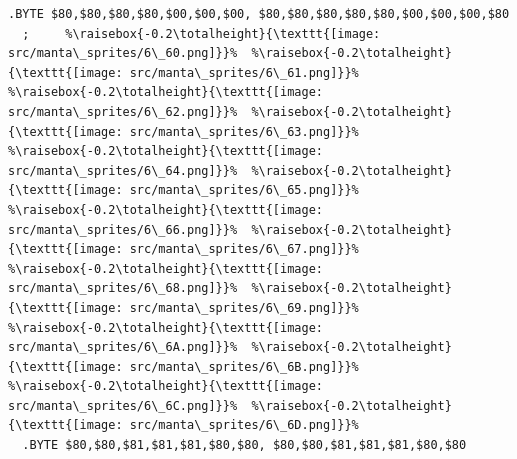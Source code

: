 \begin{lstlisting}[escapechar=\%]
  .BYTE $80,$80,$80,$80,$00,$00,$00, $80,$80,$80,$80,$80,$00,$00,$00,$80
  ;     %\raisebox{-0.2\totalheight}{\texttt{[image: src/manta\_sprites/6\_60.png]}}%  %\raisebox{-0.2\totalheight}{\texttt{[image: src/manta\_sprites/6\_61.png]}}%  %\raisebox{-0.2\totalheight}{\texttt{[image: src/manta\_sprites/6\_62.png]}}%  %\raisebox{-0.2\totalheight}{\texttt{[image: src/manta\_sprites/6\_63.png]}}%  %\raisebox{-0.2\totalheight}{\texttt{[image: src/manta\_sprites/6\_64.png]}}%  %\raisebox{-0.2\totalheight}{\texttt{[image: src/manta\_sprites/6\_65.png]}}%  %\raisebox{-0.2\totalheight}{\texttt{[image: src/manta\_sprites/6\_66.png]}}%  %\raisebox{-0.2\totalheight}{\texttt{[image: src/manta\_sprites/6\_67.png]}}%  %\raisebox{-0.2\totalheight}{\texttt{[image: src/manta\_sprites/6\_68.png]}}%  %\raisebox{-0.2\totalheight}{\texttt{[image: src/manta\_sprites/6\_69.png]}}%  %\raisebox{-0.2\totalheight}{\texttt{[image: src/manta\_sprites/6\_6A.png]}}%  %\raisebox{-0.2\totalheight}{\texttt{[image: src/manta\_sprites/6\_6B.png]}}%  %\raisebox{-0.2\totalheight}{\texttt{[image: src/manta\_sprites/6\_6C.png]}}%  %\raisebox{-0.2\totalheight}{\texttt{[image: src/manta\_sprites/6\_6D.png]}}% 
  .BYTE $80,$80,$81,$81,$81,$80,$80, $80,$80,$81,$81,$81,$80,$80
\end{lstlisting}


